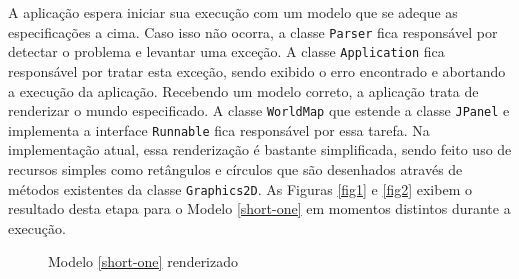 A aplicação espera iniciar sua execução com um modelo que se adeque as
especificações a cima. Caso isso não ocorra, a classe \verb!Parser!
fica responsável por detectar o problema e levantar uma exceção. A
classe \verb!Application! fica responsável por tratar esta exceção,
sendo exibido o erro encontrado e abortando a execução da aplicação.
Recebendo um modelo correto, a aplicação trata de renderizar o mundo
especificado. A classe \verb!WorldMap! que estende a classe
\verb!JPanel! e implementa a interface \verb!Runnable! fica
responsável por essa tarefa. Na implementação atual, essa renderização
é bastante simplificada, sendo feito uso de recursos simples como
retângulos e círculos que são desenhados através de métodos existentes
da classe \verb!Graphics2D!. As Figuras \ref{fig1} e \ref{fig2} exibem
o resultado desta etapa para o Modelo \ref{short-one} em momentos
distintos durante a execução.
\begin{figure}[ht!]
  \centering
  \caption{Modelo \ref{short-one} renderizado}
\end{figure}
